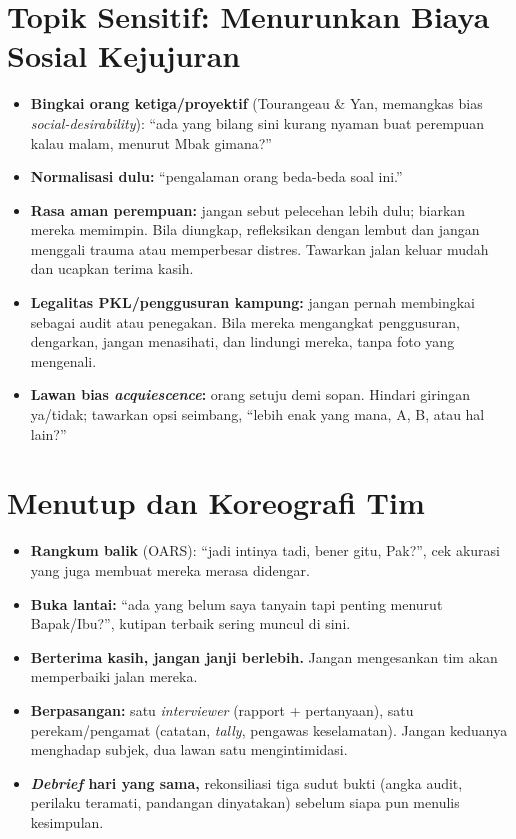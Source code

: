 \documentclass[11pt,a4paper]{report}
\begin{document}
\section{Topik Sensitif: Menurunkan Biaya Sosial Kejujuran}
\begin{itemize}
  \item \textbf{Bingkai orang ketiga/proyektif} (Tourangeau \& Yan, memangkas bias
    \emph{social-desirability}): ``ada yang bilang sini kurang nyaman buat perempuan kalau
    malam, menurut Mbak gimana?''
  \item \textbf{Normalisasi dulu:} ``pengalaman orang beda-beda soal ini.''
  \item \textbf{Rasa aman perempuan:} jangan sebut pelecehan lebih dulu; biarkan mereka
    memimpin. Bila diungkap, refleksikan dengan lembut dan jangan menggali trauma atau
    memperbesar distres. Tawarkan jalan keluar mudah dan ucapkan terima kasih.
  \item \textbf{Legalitas PKL/penggusuran kampung:} jangan pernah membingkai sebagai audit
    atau penegakan. Bila mereka mengangkat penggusuran, dengarkan, jangan menasihati, dan
    lindungi mereka, tanpa foto yang mengenali.
  \item \textbf{Lawan bias \emph{acquiescence}:} orang setuju demi sopan. Hindari giringan
    ya/tidak; tawarkan opsi seimbang, ``lebih enak yang mana, A, B, atau hal lain?''
\end{itemize}

\section{Menutup dan Koreografi Tim}
\begin{itemize}
  \item \textbf{Rangkum balik} (OARS): ``jadi intinya tadi, bener gitu, Pak?'', cek akurasi
    yang juga membuat mereka merasa didengar.
  \item \textbf{Buka lantai:} ``ada yang belum saya tanyain tapi penting menurut
    Bapak/Ibu?'', kutipan terbaik sering muncul di sini.
  \item \textbf{Berterima kasih, jangan janji berlebih.} Jangan mengesankan tim akan
    memperbaiki jalan mereka.
  \item \textbf{Berpasangan:} satu \emph{interviewer} (rapport + pertanyaan), satu
    perekam/pengamat (catatan, \emph{tally}, pengawas keselamatan). Jangan keduanya
    menghadap subjek, dua lawan satu mengintimidasi.
  \item \textbf{\emph{Debrief} hari yang sama,} rekonsiliasi tiga sudut bukti (angka audit,
    perilaku teramati, pandangan dinyatakan) sebelum siapa pun menulis kesimpulan.
\end{itemize}
\end{document}
